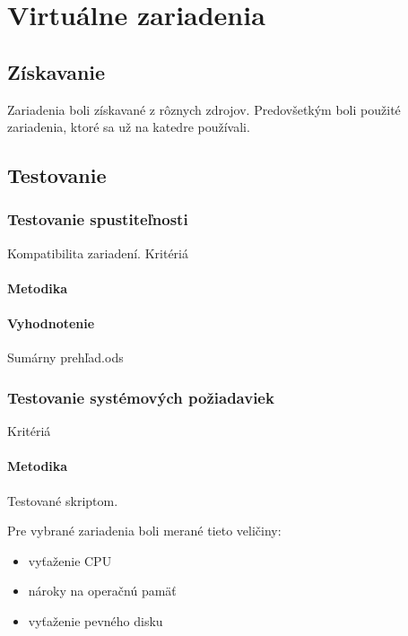 \chapter{Virtuálne zariadenia}

\section{Získavanie}

Zariadenia boli získavané z rôznych zdrojov. Predovšetkým boli použité zariadenia, ktoré sa už na katedre používali.

\section{Testovanie}

\subsection{Testovanie spustiteľnosti}

Kompatibilita zariadení.
Kritériá

\subsubsection{Metodika}

\subsubsection{Vyhodnotenie}

Sumárny prehľad.ods

\subsection{Testovanie systémových požiadaviek}

Kritériá

\subsubsection{Metodika}

Testované skriptom.


Pre vybrané zariadenia boli merané tieto veličiny:
\begin{itemize}
\item vyťaženie CPU
\item nároky na operačnú pamäť
\item vyťaženie pevného disku
\end{itemize}

